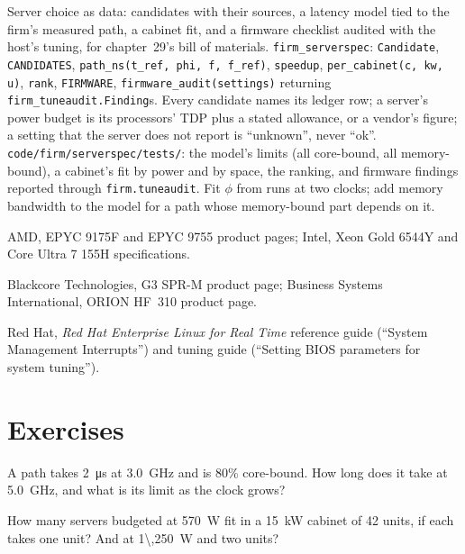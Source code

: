 \begin{build}
 Server choice as data: candidates with their sources, a latency model tied to the firm's measured path, a cabinet fit, and
a firmware checklist audited with the host's tuning, for chapter~29's bill of materials.
 \texttt{firm\_serverspec}: \texttt{Candidate}, \texttt{CANDIDATES}, \texttt{path\_ns(t\_ref, phi, f, f\_ref)},
\texttt{speedup}, \texttt{per\_cabinet(c, kw, u)}, \texttt{rank}, \texttt{FIRMWARE}, \texttt{firmware\_audit(settings)} returning
\texttt{firm\_tuneaudit.Finding}s.
 Every candidate names its ledger row; a server's power budget is its processors' TDP plus a stated allowance, or a vendor's
figure; a setting that the server does not report is ``unknown'', never ``ok''.
 \texttt{code/firm/serverspec/tests/}: the model's limits (all core-bound, all memory-bound), a cabinet's fit by power
and by space, the ranking, and firmware findings reported through \texttt{firm.tuneaudit}.
 Fit $\phi$ from runs at two clocks; add memory bandwidth to the model for a path whose memory-bound part depends on it.
\end{build}

\begin{omsources}
\item AMD, EPYC 9175F and EPYC 9755 product pages; Intel, Xeon Gold 6544Y and Core Ultra 7 155H specifications.
\item Blackcore Technologies, G3 SPR-M product page; Business Systems International, ORION HF~310 product page.
\item Red Hat, \emph{Red Hat Enterprise Linux for Real Time} reference guide (``System Management Interrupts'') and tuning guide (``Setting
BIOS parameters for system tuning'').
\end{omsources}

\section{Exercises}

\begin{exercise}[$\star$]\label{exo:nw:servers:1}
A path takes \qty{2}{\micro\second} at 3.0~GHz and is 80\% core-bound. How long does it take at 5.0~GHz, and what is its limit as the clock
grows?
\end{exercise}

\begin{exercise}[$\star$]\label{exo:nw:servers:2}
How many servers budgeted at \qty{570}{\watt} fit in a \qty{15}{\kilo\watt} cabinet of 42 units, if each takes one unit? And at
\qty{1\,250}{\watt} and two units?
\end{exercise}

